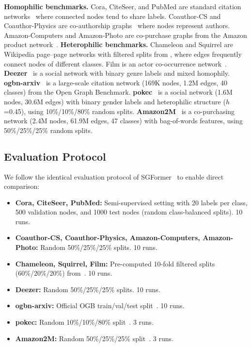\documentclass[sigconf]{acmart}
\begin{document}
\noindent\textbf{Homophilic benchmarks.} Cora, CiteSeer, and PubMed are standard citation networks~\citep{kipf2017semi, sen2008collective} where connected nodes tend to share labels. Coauthor-CS and Coauthor-Physics are co-authorship graphs~\citep{shchur2018pitfalls} where nodes represent authors. Amazon-Computers and Amazon-Photo are co-purchase graphs from the Amazon product network~\citep{shchur2018pitfalls}.
\textbf{Heterophilic benchmarks.} Chameleon and Squirrel are Wikipedia page--page networks with filtered splits from \citet{platonov2023critical}, where edges frequently connect nodes of different classes. Film is an actor co-occurrence network~\citep{pei2020geomgcn}. \textbf{Deezer}~\citep{rozemberczki2021deezer} is a social network with binary genre labels and mixed homophily.
\textbf{ogbn-arxiv}~\citep{hu2020ogb} is a large-scale citation network (169K nodes, 1.2M edges, 40 classes) from the Open Graph Benchmark.
\textbf{pokec}~\citep{lim2021large} is a social network (1.6M nodes, 30.6M edges) with binary gender labels and heterophilic structure ($h$=0.45), using 10\%/10\%/80\% random splits.
\textbf{Amazon2M}~\citep{wu2022nodeformer} is a co-purchasing network (2.4M nodes, 61.9M edges, 47 classes) with bag-of-words features, using 50\%/25\%/25\% random splits.

\subsection{Evaluation Protocol}

We follow the identical evaluation protocol of SGFormer~\citep{wu2023sgformer} to enable direct comparison:

\begin{itemize}
    \item \textbf{Cora, CiteSeer, PubMed:} Semi-supervised setting with 20 labels per class, 500 validation nodes, and 1000 test nodes (random class-balanced splits). 10 runs.
    \item \textbf{Coauthor-CS, Coauthor-Physics, Amazon-Computers, Amazon-Photo:} Random 50\%/25\%/25\% splits. 10 runs.
    \item \textbf{Chameleon, Squirrel, Film:} Pre-computed 10-fold filtered splits (60\%/20\%/20\%) from~\citet{platonov2023critical}. 10 runs.
    \item \textbf{Deezer:} Random 50\%/25\%/25\% splits. 10 runs.
    \item \textbf{ogbn-arxiv:} Official OGB train/val/test split~\citep{hu2020ogb}. 10 runs.
    \item \textbf{pokec:} Random 10\%/10\%/80\% split~\citep{lim2021large}. 3 runs.
    \item \textbf{Amazon2M:} Random 50\%/25\%/25\% split~\citep{wu2022nodeformer}. 3 runs.
\end{itemize}
\end{document}
